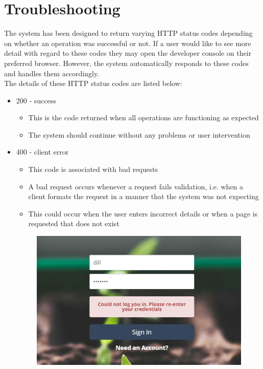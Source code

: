 \documentclass{article}
\begin{document}
\section{Troubleshooting}
	The system has been designed to return varying HTTP status codes depending on whether an operation was successful or not. If a user would like to see more detail with regard to these codes they may open the developer console on their preferred browser. However, the system automatically responds to these codes and handles them accordingly.\\
	
	The details of these HTTP status codes are listed below:
	\begin{itemize}
		\item 200 - success
			\begin{itemize}
				\item This is the code returned when all operations are functioning as expected
				\item The system should continue without any problems or user intervention
			\end{itemize}
		\item 400 - client error
			\begin{itemize}
				\item This code is associated with bad requests
				\item A bad request occurs whenever a request fails validation, i.e. when a client formats the request in a manner that the system was not expecting
				\item This could occur when the user enters incorrect details or when a page is requested that does not exist
			\end{itemize}
			\begin{figure}[H]
				\includegraphics[width=\textwidth]{../images/UserManual/400error.png}

\end{figure}
\end{itemize}
\end{document}
